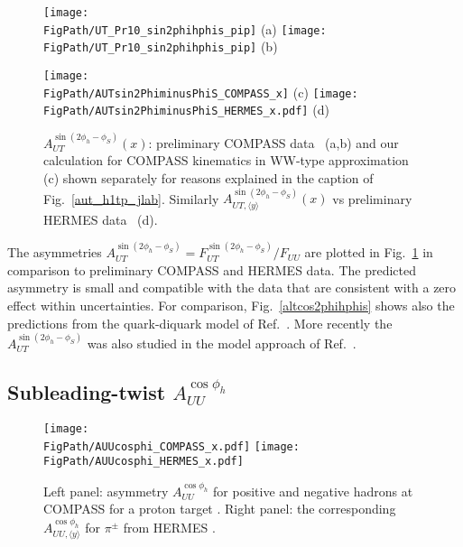 \documentclass[a4paper,11pt]{article}
\newcommand*{\FigPath}{./figs}%
\begin{document}
\begin{figure}[t!]
\centering
\texttt{[image: \\FigPath/UT\_Pr10\_sin2phihphis\_pip]} {\tiny (a)}%
\texttt{[image: \\FigPath/UT\_Pr10\_sin2phihphis\_pip]} {\tiny (b)}

\texttt{[image: \\FigPath/AUTsin2PhiminusPhiS\_COMPASS\_x]} {\tiny (c)}
\texttt{[image: \\FigPath/AUTsin2PhiminusPhiS\_HERMES\_x.pdf]} {\tiny (d)}

\vspace{-2mm}

\caption{\label{autsin2phihphis}
	$A_{UT}^{\sin(2 \phi_h - \phi_S)}(x)$: 
	preliminary COMPASS data~\cite{Parsamyan:2013fia} (a,b)
  and our calculation for COMPASS kinematics in WW-type 
      approximation (c) shown separately for reasons explained 
      in the caption of Fig.~\ref{aut_h1tp_jlab}.
	Similarly $A_{UT, \langle y \rangle}^{\sin(2\phi_h-\phi_S)}(x)$ vs
	preliminary HERMES data~\cite{Schnell:2010zza} (d).
	}
\end{figure}


The asymmetries $A_{UT}^{\sin (2 \phi_h-\phi_S)}=F_{UT}^{\sin (2 \phi_h-\phi_S)}/F_{UU}$
are plotted in Fig.~\ref{autsin2phihphis} in comparison
to preliminary COMPASS \cite{Parsamyan:2013fia} and
HERMES \cite{Schnell:2010zza} data. The predicted
asymmetry is small and compatible with the data that are consistent
with a zero effect within uncertainties.
For comparison, Fig.~\ref{altcos2phihphis} shows also the predictions
from the quark-diquark model of Ref.~\cite{Kotzinian:2008fe}.
More recently the $A_{UT}^{\sin(2\phi_h -\phi_S)}$ was also studied in the
model approach of Ref.~\cite{Mao:2014aoa}.





\subsection{\boldmath Subleading-twist  $A_{UU}^{\cos\phi_h}$ }
\label{Sec-7.7:FUUcosphi}

\begin{figure}[t!]
\centering
\texttt{[image: \\FigPath/AUUcosphi\_COMPASS\_x.pdf]}
\texttt{[image: \\FigPath/AUUcosphi\_HERMES\_x.pdf]}
\caption{\label{auucosphi_jlab}
	Left panel: asymmetry $A_{UU}^{\cos\phi_h}$ for positive and negative
	hadrons at COMPASS for a proton target \cite{Adolph:2014pwc}. Right
	panel: the corresponding $A_{UU, \langle y \rangle}^{\cos\phi_h}$ for 
	$\pi^\pm$ from HERMES \cite{Airapetian:2012yg}.}
\end{figure}
\end{document}
